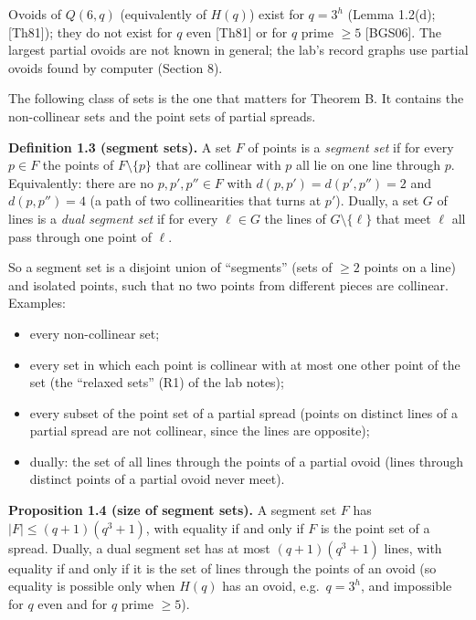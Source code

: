 \documentclass[
  11pt,
]{article}
\providecommand{\tightlist}{%
  \setlength{\itemsep}{0pt}\setlength{\parskip}{0pt}}
\begin{document}
Ovoids of \(Q(6,q)\) (equivalently of \(H(q)\)) exist for \(q = 3^h\) (Lemma 1.2(d); {[}Th81{]}); they do not exist for
\(q\) even {[}Th81{]} or for \(q\) prime \(\ge 5\) {[}BGS06{]}. The largest partial ovoids are not known in general; the
lab's record graphs use partial ovoids found by computer (Section 8).

The following class of sets is the one that matters for Theorem B. It contains the non-collinear sets and the point sets
of partial spreads.

\textbf{Definition 1.3 (segment sets).} A set \(F\) of points is a \emph{segment set} if for every \(p\in F\) the points
of \(F\setminus\{p\}\) that are collinear with \(p\) all lie on one line through \(p\). Equivalently: there are no
\(p, p', p''\in F\) with \(d(p,p') = d(p',p'') = 2\) and \(d(p,p'') = 4\) (a path of two collinearities that turns at
\(p'\)). Dually, a set \(G\) of lines is a \emph{dual segment set} if for every \(\ell\in G\) the lines of
\(G\setminus\{\ell\}\) that meet \(\ell\) all pass through one point of \(\ell\).

So a segment set is a disjoint union of ``segments'' (sets of \(\ge 2\) points on a line) and isolated points, such that
no two points from different pieces are collinear. Examples:

\begin{itemize}
\tightlist
\item
  every non-collinear set;
\item
  every set in which each point is collinear with at most one other point of the set (the ``relaxed sets'' (R1) of the
  lab notes);
\item
  every subset of the point set of a partial spread (points on distinct lines of a partial spread are not collinear,
  since the lines are opposite);
\item
  dually: the set of all lines through the points of a partial ovoid (lines through distinct points of a partial ovoid
  never meet).
\end{itemize}

\textbf{Proposition 1.4 (size of segment sets).} A segment set \(F\) has \(\lvert F\rvert\le (q+1)(q^3+1)\), with
equality if and only if \(F\) is the point set of a spread. Dually, a dual segment set has at most \((q+1)(q^3+1)\)
lines, with equality if and only if it is the set of lines through the points of an ovoid (so equality is possible only
when \(H(q)\) has an ovoid, e.g.~\(q = 3^h\), and impossible for \(q\) even and for \(q\) prime \(\ge 5\)).
\end{document}

